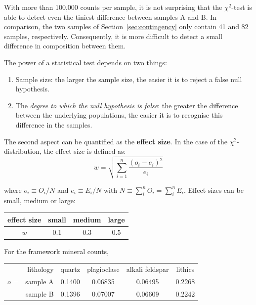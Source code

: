 With more than 100,000 counts per sample, it is not surprising that
the $\chi^2$-test is able to detect even the tiniest difference
between samples A and B.  In comparison, the two samples of
Section~\ref{sec:contingency} only contain 41 and 82 samples,
respectively. Consequently, it is more difficult to detect a small
difference in composition between them.\medskip

The power of a statistical test depends on two things:

\begin{enumerate}
  \item Sample size: the larger the sample size, the easier it is to
    reject a false null hypothesis.
  \item The \emph{degree to which the null hypothesis is false}: the
    greater the difference between the underlying populations, the
    easier it is to recognise this difference in the samples.
\end{enumerate}

The second aspect can be quantified as the \textbf{effect size}. In
the case of the $\chi^2$-distribution, the effect size is defined as:
\begin{equation}
  w = \sqrt{\sum\limits_{i=1}^{n}\frac{\left(o_i-e_i\right)^2}{e_i}}
  \label{eq:effectsize}
\end{equation}

\noindent where $o_i \equiv O_i/N$ and $e_i \equiv E_i/N$ with $N
\equiv \sum_{i}^{n}O_i = \sum_{i}^{n}E_i$.  Effect sizes can be small,
medium or large:

\begin{center}
  \begin{tabular}{c|ccc}
    effect size & small & medium & large \\ \hline
    $w$ & 0.1 & 0.3 & 0.5
  \end{tabular}
\end{center}

For the framework mineral counts,

\begin{center}
  \begin{tabular}{rr|cccc}
    & lithology & quartz & plagioclase & alkali feldspar & lithics  \\
    \cline{2-6}
    $o$ = & sample A & 0.1400 & 0.06835 & 0.06495 & 0.2268 \\
    & sample B & 0.1396 & 0.07007 & 0.06609 & 0.2242
  \end{tabular}
\end{center}

